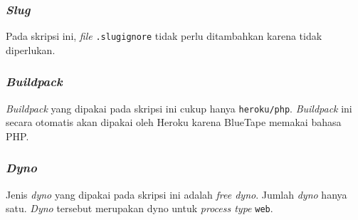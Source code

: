 	\subsubsection{\textit{Slug}}
		Pada skripsi ini, \textit{file} \texttt{.slugignore} tidak perlu ditambahkan karena tidak diperlukan.
		
	\subsubsection{\textit{Buildpack}}
	\textit{Buildpack} yang dipakai pada skripsi ini cukup hanya \texttt{heroku/php}. \textit{Buildpack} ini secara otomatis akan dipakai oleh Heroku karena BlueTape memakai bahasa PHP.
		
	\subsubsection{\textit{Dyno}}
		Jenis \textit{dyno} yang dipakai pada skripsi ini adalah \textit{free dyno}. Jumlah \textit{dyno} hanya satu. \textit{Dyno} tersebut merupakan dyno untuk \textit{process type} \texttt{web}.
		

